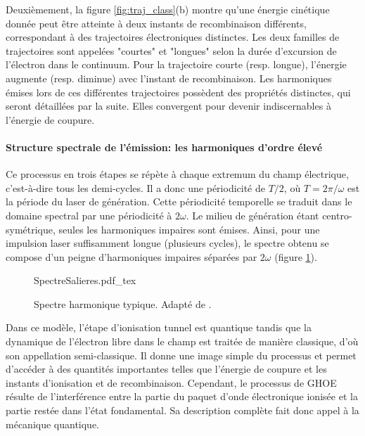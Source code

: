 Deuxièmement, la figure \ref{fig:traj_class}(b) montre qu'une énergie cinétique donnée peut être atteinte à deux instants de recombinaison différents, correspondant à des trajectoires électroniques distinctes. Les deux familles de trajectoires sont appelées "courtes" et "longues" selon la durée d'excursion de l'électron dans le continuum. Pour la trajectoire courte (resp. longue), l'énergie augmente (resp. diminue) avec l'instant de recombinaison. Les harmoniques émises lors de ces différentes trajectoires possèdent des propriétés distinctes, qui seront détaillées par la suite. Elles convergent pour devenir indiscernables à l'énergie de coupure.

\paragraph{Structure spectrale de l'émission: les harmoniques d'ordre élevé} Ce processus en trois étapes se répète à chaque extremum du champ électrique, c'est-à-dire tous les demi-cycles. Il a donc une périodicité de $T/2$, où $T = 2 \pi /\omega$ est la période du laser de génération. Cette périodicité temporelle se traduit dans le domaine spectral par une périodicité à $2 \omega$. Le milieu de génération étant centro-symétrique, seules les harmoniques impaires sont émises. Ainsi, pour une impulsion laser suffisamment longue (plusieurs cycles), le spectre obtenu se compose d'un peigne d'harmoniques impaires séparées par $2 \omega$ (figure \ref{fig:SpectreSalieres}).

\begin{figure}
\centering
\def\svgwidth{0.6\columnwidth}
{SpectreSalieres.pdf_tex}
\caption{Spectre harmonique typique. Adapté de .}
\label{fig:SpectreSalieres}
\end{figure}

Dans ce modèle, l'étape d'ionisation tunnel est quantique tandis que la dynamique de l'électron libre dans le champ est traitée de manière classique, d'où  son appellation semi-classique. Il donne une image simple du processus et permet d'accéder à des quantités importantes telles que l'énergie de coupure et les instants d'ionisation et de recombinaison. Cependant, le processus de GHOE résulte de l'interférence entre la partie du paquet d'onde électronique ionisée et la partie restée dans l'état fondamental. Sa description complète fait donc appel à la mécanique quantique.

